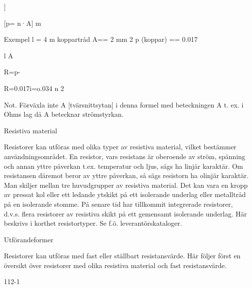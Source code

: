 ]

[p= n·A]
m

Exempel
l = 4 m koppartråd
A== 2 mm 2
p (koppar) == 0.017

l
A

R=p-

R=0.017i=o.034 n
2

Not. Förväxla inte A [tvärsnittsytan] i denna
formel med beteckningen A t. ex. i Ohms lag då A
betecknar strömstyrkan.

Resistiva material

Resistorer kan utföras med olika typer av
resistiva material, vilket bestämmer användningsområdet.
En resistor, vars resistans är oberoende
av ström, spänning och annan yttre påverkan t.ex. temperatur och ljus, sägs ha linjär
karaktär. Om resistansen däremot beror av
yttre påverkan, så sägs resistorn ha olinjär
karaktär.
Man skiljer mellan tre huvudgrupper av
resistiva material. Det kan vara en kropp av
pressat kol eller ett ledande ytskikt på ett
isolerande underlag eller metalltråd på en
isolerande stomme. På senare tid har tillkommit integrerade resistorer, d.v.s. flera
resistorer av resistiva skikt på ett gemensamt isolerande underlag. Här beskrivs i
korthet
resistortyper. Se f.ö. leverantörskataloger.

Utförandeformer

Resistorer kan utföras med fast eller ställbart resistansvärde. Här följer först en översikt över resistorer med olika resistiva material och fast resistansvärde.

112-1

